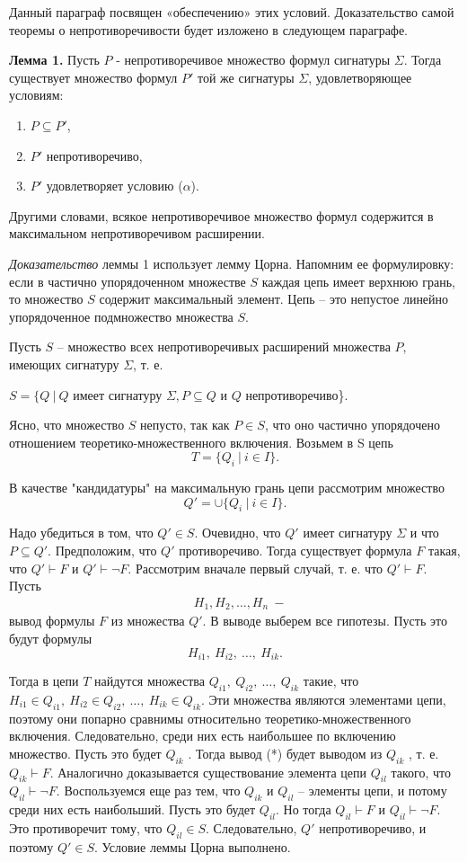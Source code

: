\documentclass[a4paper]{article}
\begin{document}
Данный параграф посвящен «обеспечению» этих условий. Доказательство самой теоремы о непротиворечивости будет изложено в следующем параграфе.

\textbf{Лемма 1.} Пусть $P$ - непротиворечивое множество формул сигнатуры $\Sigma$. Тогда существует множество формул $P'$ той же сигнатуры $\Sigma$, удовлетворяющее условиям:
\begin{enumerate}
	\item $P \subseteq P'$,
	\item $P'$ непротиворечиво,
	\item $P'$ удовлетворяет условию ($\alpha$).
\end{enumerate}

Другими словами, всякое непротиворечивое множество формул содержится в максимальном непротиворечивом расширении.

\textit {Доказательство} леммы 1 использует лемму Цорна. Напомним ее формулировку: если в частично упорядоченном множестве $S$ каждая цепь имеет верхнюю грань, то множество $S$ содержит максимальный элемент. Цепь – это непустое линейно упорядоченное подмножество множества $S$.

Пусть $S$ – множество всех непротиворечивых расширений множества $P$, имеющих сигнатуру $\Sigma$, т. е.

$S = \{Q\ |\ Q$ имеет сигнатуру $\Sigma, P \subseteq Q$ и $Q$ непротиворечиво\}.

Ясно, что множество $S$ непусто, так как $P \in S$, что оно частично упорядочено отношением теоретико-множественного включения. Возьмем в S цепь  $$
T  = \{ Q_i\ |\ i \in I \}.
$$

В качестве "кандидатуры" на максимальную грань цепи рассмотрим множество 
$$
Q' = \cup \{ Q_i\ |\ i \in I \}.
$$

Надо убедиться в том, что $Q' \in S$. Очевидно, что $Q'$ имеет сигнатуру $\Sigma$ и что $P \subseteq Q'$. Предположим, что $Q'$ противоречиво. Тогда существует формула $F$ такая, что $Q' \vdash F$ и $Q' \vdash \neg F$. Рассмотрим вначале первый случай, т. е. что $Q' \vdash F$. Пусть 
\begin{align}
	& H_1, H_2, \dots, H_n\ - \tag{*}
\end{align}
вывод формулы $F$ из множества $Q'$. В выводе выберем все гипотезы. Пусть это будут формулы 
$$
H_{i1},\ H_{i2},\ \dots,\ H_{ik}.
$$

Тогда в  цепи $T$ найдутся множества $Q_{i1},\ Q_{i2},\ \dots,\ Q_{ik}$ такие, что $H_{i1} \in Q_{i1},\ H_{i2} \in Q_{i2},\ \dots,\ H_{ik} \in Q_{ik}.$ Эти множества являются элементами цепи, поэтому они попарно сравнимы относительно теоретико-множественного включения. Следовательно, среди них есть наибольшее по включению множество. Пусть это будет $Q_{ik}$ . Тогда вывод (*) будет выводом из $Q_{ik}$ , т. е. $Q_{ik} \vdash F$. Аналогично доказывается существование элемента цепи $Q_{il}$ такого, что $Q_{il} \vdash \neg F$. Воспользуемся еще раз тем, что $Q_{ik}$ и $Q_{il}$ – элементы цепи, и потому среди них есть наибольший. Пусть это будет $Q_{il}$. Но тогда $Q_{il} \vdash F$ и $Q_{il} \vdash \neg F$. Это противоречит тому, что $Q_{il} \in S$. Следовательно, $Q'$ непротиворечиво, и поэтому $Q' \in S$. Условие леммы Цорна выполнено.
\end{document}
